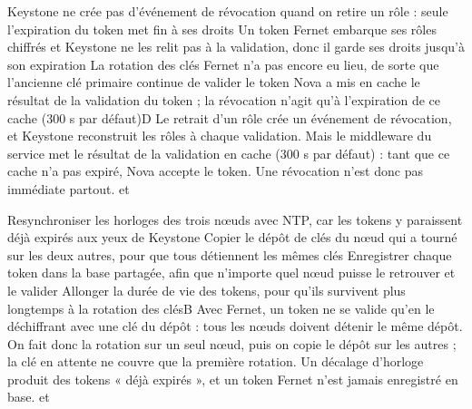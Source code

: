   {Keystone ne crée pas d'événement de révocation quand on retire un rôle : seule l'expiration du token met fin à ses droits}
  {Un token Fernet embarque ses rôles chiffrés et Keystone ne les relit pas à la validation, donc il garde ses droits jusqu'à son expiration}
  {La rotation des clés Fernet n'a pas encore eu lieu, de sorte que l'ancienne clé primaire continue de valider le token}
  {Nova a mis en cache le résultat de la validation du token ; la révocation n'agit qu'à l'expiration de ce cache (300 s par défaut)}{D}
  {Le retrait d'un rôle crée un événement de révocation, et Keystone reconstruit les rôles à chaque validation. Mais le middleware du service met le résultat de la validation en cache (300 s par défaut) : tant que ce cache n'a pas expiré, Nova accepte le token. Une révocation n'est donc pas immédiate partout.}
  { et }

  {Resynchroniser les horloges des trois nœuds avec NTP, car les tokens y paraissent déjà expirés aux yeux de Keystone}
  {Copier le dépôt de clés du nœud qui a tourné sur les deux autres, pour que tous détiennent les mêmes clés}
  {Enregistrer chaque token dans la base partagée, afin que n'importe quel nœud puisse le retrouver et le valider}
  {Allonger la durée de vie des tokens, pour qu'ils survivent plus longtemps à la rotation des clés}{B}
  {Avec Fernet, un token ne se valide qu'en le déchiffrant avec une clé du dépôt : tous les nœuds doivent détenir le même dépôt. On fait donc la rotation sur un seul nœud, puis on copie le dépôt sur les autres ; la clé en attente ne couvre que la première rotation. Un décalage d'horloge produit des tokens « déjà expirés », et un token Fernet n'est jamais enregistré en base.}
  { et }

